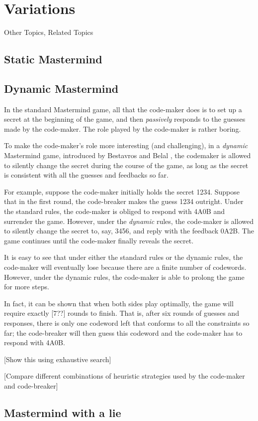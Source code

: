 \section{Variations}

Other Topics, Related Topics

\subsection{Static Mastermind}

\subsection{Dynamic Mastermind}

In the standard Mastermind game, all that the code-maker does is to set up a secret at the beginning of the game, and then \emph{passively} responds to the guesses made by the code-maker. The role played by the code-maker is rather boring.

To make the code-maker's role more interesting (and challenging), in a \emph{dynamic} Mastermind game, introduced by Bestavros and Belal \cite{bestavros86}, the codemaker is allowed to silently change the secret during the course of the game, as long as the secret is consistent with all the guesses and feedbacks so far. 

For example, suppose the code-maker initially holds the secret 1234. Suppose that in the first round, the code-breaker makes the guess 1234 outright. Under the standard rules, the code-maker is obliged to respond with 4A0B and surrender the game. However, under the \emph{dynamic} rules, the code-maker is allowed to silently change the secret to, say, 3456, and reply with the feedback 0A2B. The game continues until the code-maker finally reveals the secret.

It is easy to see that under either the standard rules or the dynamic rules, the code-maker will eventually lose because there are a finite number of codewords. However, under the dynamic rules, the code-maker is able to prolong the game for more steps. 

In fact, it can be shown that when both sides play optimally, the game will require exactly [7??] rounds to finish. That is, after six rounds of guesses and responses, there is only one codeword left that conforms to all the constraints so far; the code-breaker will then guess this codeword and the code-maker has to respond with 4A0B.

[Show this using exhaustive search]

[Compare different combinations of heuristic strategies used by the code-maker and code-breaker]


\subsection{Mastermind with a lie}

